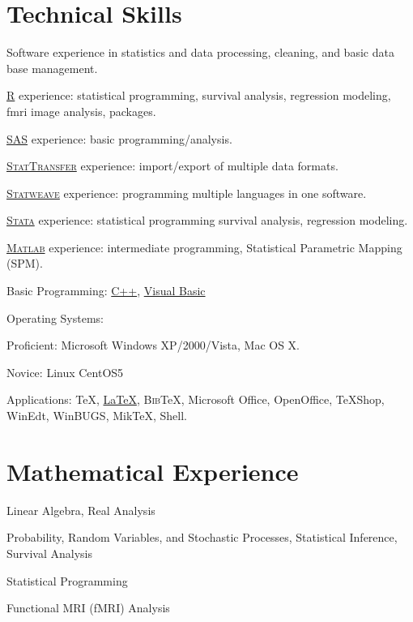 \documentclass[11pt,a4paper]{moderncv}
\begin{document}
\section{ \large Technical Skills}
%
Software experience in statistics and data processing, cleaning, and basic data base management.  



\href{http://cran.r-project.org/}{\textsc{R}}
        experience: statistical programming, survival analysis, regression modeling, fmri image analysis, packages.



\href{http://www.sas.com}{\textsc{SAS}}
        experience: basic programming/analysis.



\href{http://www.stattransfer.com/}{\textsc{StatTransfer}}
        experience: import/export of multiple data formats.



\href{http://www.cs.uiowa.edu/~rlenth/StatWeave/}{\textsc{Statweave}}
        experience: programming multiple languages in one software.



\href{http://www.stata.com}{\textsc{Stata}}
        experience: statistical programming survival analysis, regression modeling.



\href{http://www.matlab.com}{\textsc{Matlab}}
        experience: intermediate programming, Statistical Parametric Mapping (SPM).  
        


Basic Programming: \href{http://www.cplusplus.com/}{C++}, \href{http://msdn.microsoft.com/en-us/vbasic/default}{Visual Basic}



Operating Systems: 
\setlength{\parindent}{0.5in}

\indent Proficient: Microsoft Windows XP/2000/Vista, Mac OS X.

\indent Novice: Linux CentOS5
\setlength{\parindent}{0in}



Applications: \TeX{}, \href{http://www.latex-project.org/}{\LaTeX{}}, B\textsc{ib}\TeX{}, Microsoft Office, OpenOffice, TeXShop, WinEdt, WinBUGS, MikTeX, Shell.  

\section{ Mathematical Experience}
%
Linear Algebra, Real Analysis



Probability, Random Variables, and Stochastic Processes, Statistical Inference, Survival Analysis



Statistical Programming



Functional MRI (fMRI) Analysis 
\nocite{*}

%

\end{document}
